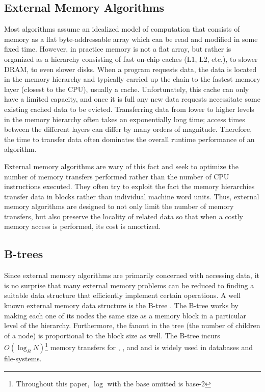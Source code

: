 \documentclass[preprint]{style}
\begin{document}
\subsection{External Memory Algorithms}

Most algorithms assume an idealized model of computation that consists of
memory as a flat byte-addressable array which can be read and modified in some
fixed time. However, in practice memory is not a flat array, but rather is
organized as a hierarchy consisting of fast on-chip caches (L1, L2, etc.), to
slower DRAM, to even slower disks. When a program requests data, the data is
located in the memory hierarchy and typically carried up the chain to the
fastest memory layer (closest to the CPU), usually a cache. Unfortunately, this
cache can only have a limited capacity, and once it is full any new data
requests necessitate some existing cached data to be evicted. Transferring data
from lower to higher levels in the memory hierarchy often takes an
exponentially long time; access times between the different layers can differ
by many orders of magnitude. Therefore, the time to transfer data often
dominates the overall runtime performance of an algorithm. 

External memory algorithms are wary of this fact and seek to optimize the
number of memory transfers performed rather than the number of CPU instructions
executed. They often try to exploit the fact the memory hierarchies transfer
data in blocks rather than individual machine word units. Thus, external memory
algorithms are designed to not only limit the number of memory transfers, but
also preserve the locality of related data so that when a costly memory access
is performed, its cost is amortized.

\subsection{B-trees}

Since external memory algorithms are primarily concerned with accessing data,
it is no surprise that many external memory problems can be reduced to finding
a suitable data structure that efficiently implement certain operations. A well
known external memory data structure is the B-tree \cite{BayerM72}. The B-tree
works by making each one of its nodes the same size as a memory block in a
particular level of the hierarchy. Furthermore, the fanout in the tree (the
number of children of a node) is proportional to the block size as well.  The
B-tree incurs $O(\log_{B}{N})$\footnote{Throughout this paper, $\log$ with the
base omitted is base-$2$} memory transfers for \Search{}, \Insert{}, and
\Delete{} and is widely used in databases and file-systems.
\end{document}
